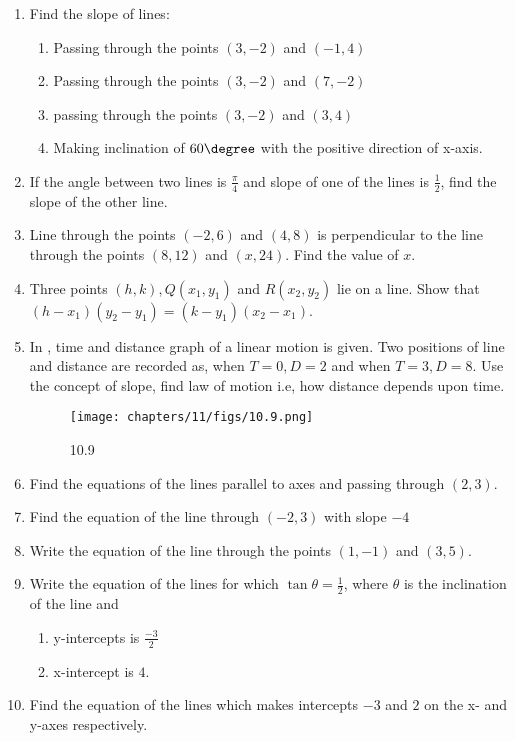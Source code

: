 \begin{enumerate}
\item Find the slope of lines:
\begin{enumerate}
\item  Passing through the points $(3,-2)$ and $(-1,4)$
\item  Passing through the points $(3,-2)$ and $(7,-2)$
\item  passing through the points $(3,-2)$ and $(3,4)$	
\item  Making inclination of $60\degree$ with the positive direction of x-axis.
\end{enumerate}
\item If the angle between two lines is $\frac{\pi}{4}$ and slope of one of the lines is $\frac{1}{2}$, find the slope of the other line.
\item Line through the points $(-2,6)$ and $(4,8)$ is perpendicular to the line through the points $(8,12)$ and $(x,24)$. Find the value of $x$.
\item Three points $(h,k), Q(x_1,y_1)$ and $R(x_2,y_2)$ lie on a line. Show that $(h-x_1)(y_2-y_1)=(k-y_1)(x_2-x_1)$.
\item In , time and distance graph of a linear motion is given. Two positions of line and distance are recorded as, when $T=0,D=2$ and when $T=3,D=8$. Use the concept of slope, find law of motion i.e, how distance depends upon time.
\begin{figure}[h]
\centering
\texttt{[image: chapters/11/figs/10.9.png]}
\caption{10.9}
  \label{fig:10.9}
\end{figure}
\item Find the equations of the lines parallel to axes and passing through $(2,3)$.
\item Find the equation of the line through $(-2,3)$ with slope $-4$
\item Write the equation of the line through the points $(1,-1)$ and $(3,5)$.
\item Write the equation of the lines for which $\tan \theta=\frac{1}{2}$, where $\theta$ is the inclination of the line and
\begin{enumerate}[label=(\roman*)]
\item  y-intercepts is $\frac{-3}{2}$ 
\item  x-intercept is $4$.
\end{enumerate}
\item Find the equation of the lines which makes intercepts $-3$ and $2$ on the x- and y-axes respectively.

\end{enumerate}
